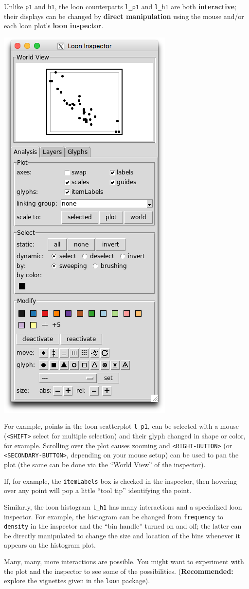 \documentclass[]{article}
\begin{document}
Unlike \texttt{p1} and \texttt{h1}, the loon counterparts \texttt{l\_p1}
and \texttt{l\_h1} are both \textbf{interactive}; their displays can be
changed by \textbf{direct manipulation} using the mouse and/or each loon
plot's \textbf{loon inspector}.

\begin{center}\includegraphics[width=0.25\linewidth]{./img/ggplots2loon//inspector_l_p1} \end{center}

For example, points in the loon scatterplot \texttt{l\_p1}, can be
selected with a mouse (\texttt{\textless{}SHIFT\textgreater{}} select
for multiple selection) and their glyph changed in shape or color, for
example. Scrolling over the plot causes zooming and
\texttt{\textless{}RIGHT-BUTTON\textgreater{}} (or
\texttt{\textless{}SECONDARY-BUTTON\textgreater{}}, depending on your
mouse setup) can be used to pan the plot (the same can be done via the
``World View'' of the inspector).

If, for example, the \texttt{itemLabels} box is checked in the
inspector, then hovering over any point will pop a little ``tool tip''
identifying the point.

Similarly, the loon histogram \texttt{l\_h1} has many interactions and a
specialized loon inspector. For example, the histogram can be changed
from \texttt{frequency} to \texttt{density} in the inspector and the
``bin handle'' turned on and off; the latter can be directly manipulated
to change the size and location of the bins whenever it appears on the
histogram plot.

Many, many, more interactions are possible. You might want to experiment
with the plot and the inspector to see some of the possibilities.
(\textbf{Recommended:} explore the vignettes given in the \texttt{loon}
package).
\end{document}
